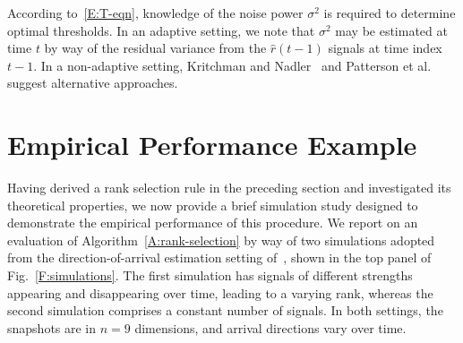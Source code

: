 \documentclass[final]{IEEEtran} %
\begin{document}
According to~\eqref{E:T-eqn}, knowledge of the noise power $\sigma^2$ is required to determine optimal thresholds.  In an adaptive setting, we note that $\sigma^2$ may be estimated at time $t$ by way of the residual variance from the $\hat r(t-1)$ signals at time index $t-1$.  In a non-adaptive setting, Kritchman and Nadler~\cite{kritchman2008dnc} and Patterson et al.~\cite{patterson2006psa} suggest alternative approaches.


\section{Empirical Performance Example}
\label{S:emp-perf}

Having derived a rank selection rule in the preceding section and investigated its theoretical properties, we now provide a brief simulation study designed to demonstrate the empirical performance of this procedure.  We report on an evaluation of Algorithm~\ref{A:rank-selection} by way of two simulations adopted from the direction-of-arrival estimation setting of~\cite{kavcic1996are}, shown in the top panel of Fig.~\ref{F:simulations}.  The first simulation has signals of different strengths appearing and disappearing over time, leading to a varying rank, whereas the second simulation comprises a constant number of signals.  In both settings, the snapshots are in $n = 9$ dimensions, and arrival directions vary over time.
\end{document}
